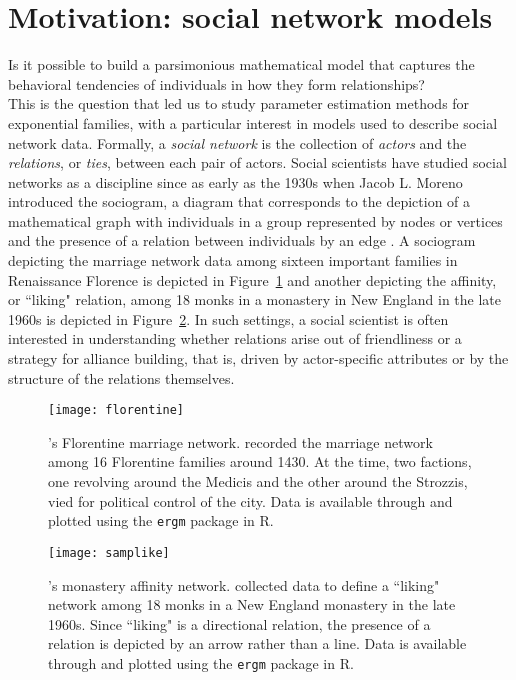 \section{Motivation: social network models}
Is it possible to build a parsimonious mathematical model that captures the 
behavioral tendencies of individuals in how they form relationships?\\  %

This is the question that led us to study parameter estimation methods for exponential 
families, with a particular interest in models used to describe social network data.  
Formally, a \emph{social network} is the collection of \emph{actors} and the 
\emph{relations}, or \emph{ties}, between each pair of actors.
Social scientists have studied social networks as a discipline since as early as the 
1930s when Jacob L. Moreno introduced the sociogram, a diagram that corresponds to
the depiction of a mathematical graph with individuals in a group 
represented by nodes or vertices and the presence of a relation between 
individuals by an edge \citep{Wasserman:1994}.  
A sociogram depicting the marriage network data among sixteen 
important families in Renaissance Florence \citep{Padgett} is depicted in 
Figure~\ref{F:Florentine} and another depicting the affinity, or ``liking" relation, among 18 
monks in a monastery in New England in the late 1960s \citep{Sampson} is depicted in 
Figure~\ref{F:Sampson}.  In such settings, a social scientist is often interested in 
understanding whether relations arise out of friendliness or a strategy for alliance 
building, that is, driven by actor-specific attributes or by the structure of  the relations themselves.
\begin{figure}
\begin{center}
\texttt{[image: florentine]} %
\end{center}
\caption[\citeauthor{Padgett}'s \citeyearpar{Padgett} Florentine marriage network]{
\citeauthor{Padgett}'s \citeyearpar{Padgett} Florentine marriage network.  \citeauthor{Padgett} recorded the marriage network among 16 Florentine families around 1430.  At the time, two factions, one revolving around the 
Medicis and the other around the Strozzis, vied for political control of the city.   
Data is available through and plotted using the \texttt{ergm} package \citep*{ergm} in 
R.}
\label{F:Florentine}
\end{figure}

\begin{figure}
\begin{center}
\texttt{[image: samplike]}
\end{center}
\caption[\citeauthor{Sampson}'s \citeyearpar{Sampson} monastery affinity network]
{\citeauthor{Sampson}'s \citeyearpar{Sampson} monastery affinity network.  \citeauthor{Sampson} collected data to define a ``liking" network among 18 monks 
in a New England monastery in the late 1960s.  Since ``liking" is a directional 
relation, the presence of a relation is depicted by an arrow rather than a line.  Data 
is available through and plotted using the \texttt{ergm} package \citep{ergm} in R.}
\label{F:Sampson}
\end{figure}

